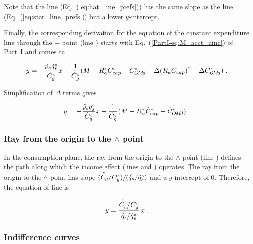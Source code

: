 Note that the \hathat{} line (Eq.~(\ref{eq:hat_line_prefs})) has the same slope as 
the \starstar{} line (Eq.~(\ref{eq:star_line_prefs}))
but a lower $y$-intercept.

Finally, the corresponding derivation
for the equation of the constant expenditure line through the 
$-$ point (line \barbar{}) starts with Eq.~(\ref{PartI-eq:M_acct_ainc}) of Part~I 
and comes to

\begin{equation} 
  y = - \frac{\tilde{p}_s {}{\dot{q}}^{\scriptscriptstyle \circ}_s}{{}{\dot{C}}^{\scriptscriptstyle \circ}_g} x
        + \frac{1}{{}{\dot{C}}^{\scriptscriptstyle \circ}_g} (\dot{M} - {}{R}^{\scriptscriptstyle \circ}_\alpha {}{\dot{C}}^{\scriptscriptstyle \circ}_{cap} - {}{\dot{C}}^{\scriptscriptstyle \circ}_{O\!M\!d}
                                   - \Delta {(R_\alpha \dot{C}_{cap})}^* - \Delta {\dot{C}}^*_{O\!M\!d}) \; .
\end{equation}

Simplification of $\Delta$ terms gives

\begin{equation} \label{eq:bar_line_prefs}
  y = - \frac{\tilde{p}_s {}{\dot{q}}^{\scriptscriptstyle \circ}_s}{{}{\dot{C}}^{\scriptscriptstyle \circ}_g} x
        + \frac{1}{{}{\dot{C}}^{\scriptscriptstyle \circ}_g} (\dot{M} - {R}^*_\alpha {\dot{C}}^*_{cap} - {\dot{C}}^*_{O\!M\!d}) \; .
\end{equation}
%


\subsubsection{Ray from the origin to the $\wedge$ point} 
\label{sec:pref_graph_ray}

In the consumption plane,
the ray from the origin to the $\wedge$ point 
(line \rr{})
defines the path along which the income effect
(lines \hatd{} and \dbar{})
operates.
The ray from the origin to the $\wedge$ point
has slope $(\hat{\dot{C}}_g/{}{\dot{C}}^{\scriptscriptstyle \circ}_g) / (\hat{\dot{q}}_s/{}{\dot{q}}^{\scriptscriptstyle \circ}_s)$
and a $y$-intercept of 0.
Therefore, the equation of line \rr{} is

\begin{equation} \label{eq:ray_cons}
  y = \frac{\hat{\dot{C}}_g/{}{\dot{C}}^{\scriptscriptstyle \circ}_g}{\hat{\dot{q}}_s/{}{\dot{q}}^{\scriptscriptstyle \circ}_s} \, x \; .
\end{equation}


\subsubsection{Indifference curves} 
\label{sec:cons_graph_indifference_curves}

